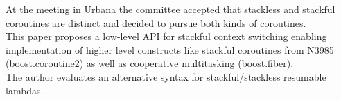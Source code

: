 At the meeting in Urbana the committee accepted that stackless and stackful
coroutines are distinct and decided to pursue both kinds of coroutines.\\
This paper proposes a low-level API for stackful context switching enabling
implementation of higher level constructs like stackful coroutines from N3985
(boost.coroutine2\cite{bcoroutine2}) as well as cooperative multitasking
(boost.fiber\cite{bfiber}).\\
The author evaluates an alternative syntax for stackful/stackless resumable
lambdas.
